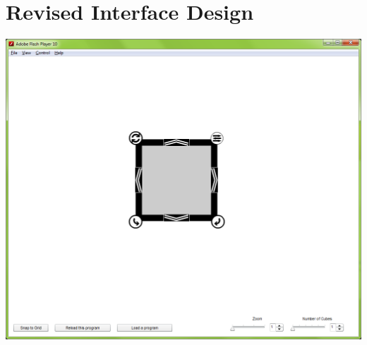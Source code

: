 \documentclass[12pt]{article}
\begin{document}
\section{Revised Interface Design}
\begin{center}
  \includegraphics[scale=.4]{../prototype/prototype2.png}
\end{center}
\end{document}
